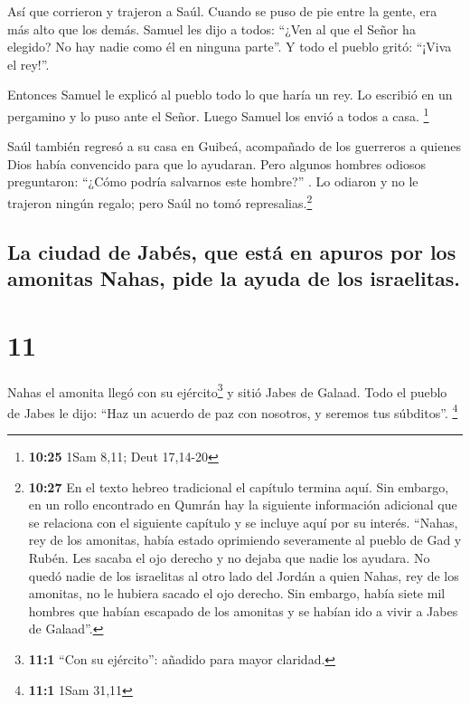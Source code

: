  Así que corrieron y trajeron a Saúl. Cuando se puso de
pie entre la gente, era más alto que los demás.  Samuel
les dijo a todos: ``¿Ven al que el Señor ha elegido? No hay nadie como
él en ninguna parte''. Y todo el pueblo gritó: ``¡Viva el rey!''.

 Entonces Samuel le explicó al pueblo todo lo que haría
un rey. Lo escribió en un pergamino y lo puso ante el Señor. Luego
Samuel los envió a todos a casa. \footnote{\textbf{10:25} 1Sam 8,11;
  Deut 17,14-20}

 Saúl también regresó a su casa en Guibeá, acompañado de
los guerreros a quienes Dios había convencido para que lo ayudaran.
 Pero algunos hombres odiosos preguntaron: ``¿Cómo podría
salvarnos este hombre?'' . Lo odiaron y no le trajeron ningún regalo;
pero Saúl no tomó represalias.\footnote{\textbf{10:27} En el texto
  hebreo tradicional el capítulo termina aquí. Sin embargo, en un rollo
  encontrado en Qumrán hay la siguiente información adicional que se
  relaciona con el siguiente capítulo y se incluye aquí por su interés.
  ``Nahas, rey de los amonitas, había estado oprimiendo severamente al
  pueblo de Gad y Rubén. Les sacaba el ojo derecho y no dejaba que nadie
  los ayudara. No quedó nadie de los israelitas al otro lado del Jordán
  a quien Nahas, rey de los amonitas, no le hubiera sacado el ojo
  derecho. Sin embargo, había siete mil hombres que habían escapado de
  los amonitas y se habían ido a vivir a Jabes de Galaad''.}

\hypertarget{la-ciudad-de-jabuxe9s-que-estuxe1-en-apuros-por-los-amonitas-nahas-pide-la-ayuda-de-los-israelitas.}{%
\subsection{La ciudad de Jabés, que está en apuros por los amonitas
Nahas, pide la ayuda de los
israelitas.}\label{la-ciudad-de-jabuxe9s-que-estuxe1-en-apuros-por-los-amonitas-nahas-pide-la-ayuda-de-los-israelitas.}}

\hypertarget{section-10}{%
\section{11}\label{section-10}}

 Nahas el amonita llegó con su ejército\footnote{\textbf{11:1}
  ``Con su ejército'': añadido para mayor claridad.} y sitió Jabes de
Galaad. Todo el pueblo de Jabes le dijo: ``Haz un acuerdo de paz con
nosotros, y seremos tus súbditos''. \footnote{\textbf{11:1} 1Sam 31,11}

